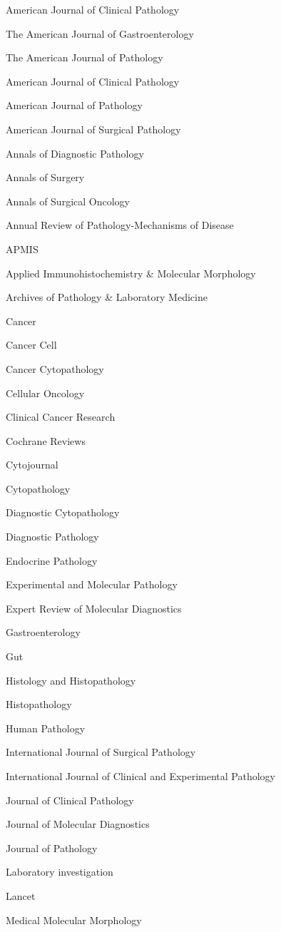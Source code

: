 \documentclass[]{article}
\begin{document}
American Journal of Clinical Pathology

The American Journal of Gastroenterology

The American Journal of Pathology

American Journal of Clinical Pathology

American Journal of Pathology

American Journal of Surgical Pathology

Annals of Diagnostic Pathology

Annals of Surgery

Annals of Surgical Oncology

Annual Review of Pathology-Mechanisms of Disease

APMIS

Applied Immunohistochemistry \& Molecular Morphology

Archives of Pathology \& Laboratory Medicine

Cancer

Cancer Cell

Cancer Cytopathology

Cellular Oncology

Clinical Cancer Research

Cochrane Reviews

Cytojournal

Cytopathology

Diagnostic Cytopathology

Diagnostic Pathology

Endocrine Pathology

Experimental and Molecular Pathology

Expert Review of Molecular Diagnostics

Gastroenterology

Gut

Histology and Histopathology

Histopathology

Human Pathology

International Journal of Surgical Pathology

International Journal of Clinical and Experimental Pathology

Journal of Clinical Pathology

Journal of Molecular Diagnostics

Journal of Pathology

Laboratory investigation

Lancet

Medical Molecular Morphology
\end{document}
